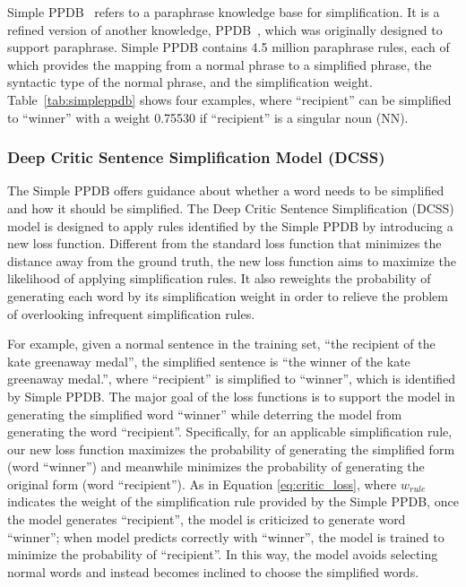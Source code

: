 \documentclass[11pt,a4paper]{article}
\begin{document}
Simple PPDB~\cite{pavlick2016simple} refers to a paraphrase knowledge base for simplification. It is a refined version of another knowledge, PPDB~\cite{ganitkevitch2013ppdb}, which was originally designed to support paraphrase. Simple PPDB contains 4.5 million paraphrase rules, each of which provides the mapping from a normal phrase to a simplified phrase, the syntactic type of the normal phrase, and the simplification weight. Table~\ref{tab:simpleppdb} shows four examples, where ``recipient'' can be simplified to ``winner'' with a weight 0.75530 if ``recipient'' is a singular noun (NN). 




\subsubsection{Deep Critic Sentence Simplification Model (DCSS)}

The Simple PPDB offers guidance about whether a word needs to be simplified and how it should be simplified. The Deep Critic Sentence Simplification (DCSS) model is designed to apply rules identified by the Simple PPDB by introducing a new loss function. Different from the standard loss function that minimizes the distance away from the ground truth, the new loss function aims to maximize the likelihood of applying simplification rules. It also reweights the probability of generating each word by its simplification weight in order to relieve the problem of overlooking infrequent simplification rules.

For example, given a normal sentence in the training set, ``the recipient of the kate greenaway medal'', the simplified sentence is ``the winner of the kate greenaway medal.'', where ``recipient'' is simplified to ``winner'', which is identified by Simple PPDB. The major goal of the loss functions is to support the model in generating the simplified word ``winner'' while deterring the model from generating the word ``recipient''. Specifically, for an applicable simplification rule, our new loss function maximizes the probability of generating the simplified form (word ``winner'') and meanwhile minimizes the probability of generating the original form (word ``recipient''). As in Equation \ref{eq:critic_loss}, where $w_{rule}$ indicates the weight of the simplification rule provided by the Simple PPDB, once the model generates ``recipient'', the model is criticized to generate word ``winner''; when model predicts correctly with ``winner'', the model is trained to minimize the probability of ``recipient''.
In this way, the model avoids selecting normal words and instead becomes inclined to choose the simplified words.
\end{document}
